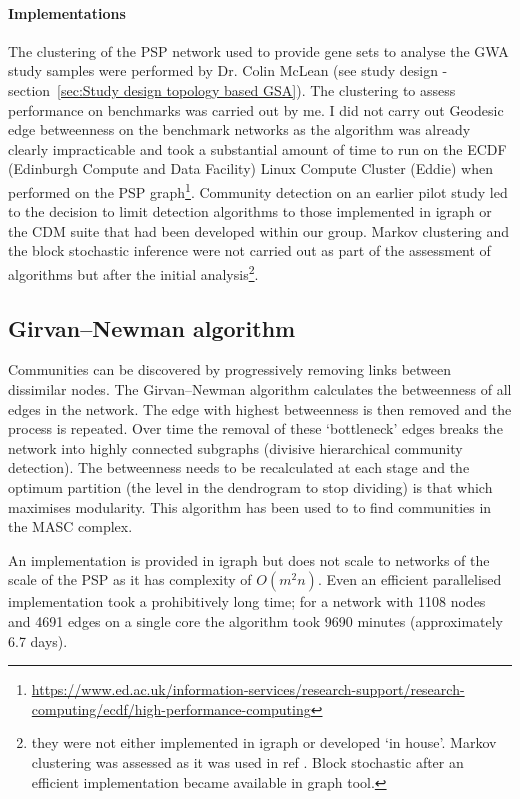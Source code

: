 \paragraph{Implementations}
The clustering of the PSP network used to provide gene sets to analyse the GWA study samples were performed by Dr. Colin McLean (see study design - section~\ref{sec:Study design topology based GSA}). The clustering to assess performance on benchmarks was carried out by me. I did not carry out Geodesic edge betweenness on the benchmark networks as the algorithm was already clearly impracticable and took a substantial amount of time to run on the ECDF (Edinburgh Compute and Data Facility) Linux Compute Cluster (Eddie) when performed on the PSP graph\footnote{\url{https://www.ed.ac.uk/information-services/research-support/research-computing/ecdf/high-performance-computing}}. Community detection on an earlier pilot study led to the decision to limit detection algorithms to those implemented in igraph or the CDM suite that had been developed within our group.  Markov clustering and the block stochastic inference were not carried out as part of the assessment of algorithms but after the initial analysis\footnote{they were not either implemented in igraph or developed `in house'. Markov clustering was assessed as it was used in ref \cite{ghiassian2015disease}. Block stochastic after an efficient implementation became available in graph tool\cite{peixoto_graph-tool_2014}.}.

\subsection{Girvan–Newman algorithm}
\label{sec:Newman and Girvan}
Communities can be discovered by progressively removing links between dissimilar nodes. The Girvan–Newman algorithm\cite{girvan2002community} calculates the betweenness of all edges in the network. The edge with highest betweenness is then removed and the process is repeated. Over time the removal of these `bottleneck' edges breaks the network into highly connected subgraphs (divisive hierarchical community detection). The betweenness
needs to be recalculated at each stage and the optimum partition (the level in the dendrogram to stop dividing) is that which maximises modularity. This algorithm has been used to  to find
communities in the MASC complex\cite{pocklington2006proteomes}.

An implementation is provided in igraph but does not scale to networks of the scale of the PSP as it has complexity of $O(m^2n)$\cite{newman2004finding}. Even an efficient parallelised implementation took a prohibitively long time; for a network with 1108 nodes and 4691 edges on a single core the algorithm took 9690 minutes (approximately 6.7 days)\cite{mclean2016improved}.


